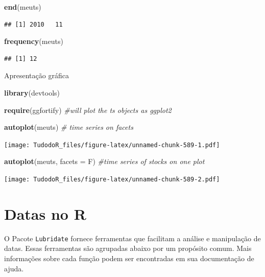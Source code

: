 \documentclass[
]{book}
\newenvironment{Shaded}{\begin{snugshade}}{\end{snugshade}}
\newcommand{\CommentTok}[1]{\textcolor[rgb]{0.56,0.35,0.01}{\textit{#1}}}
\newcommand{\DataTypeTok}[1]{\textcolor[rgb]{0.13,0.29,0.53}{#1}}
\newcommand{\KeywordTok}[1]{\textcolor[rgb]{0.13,0.29,0.53}{\textbf{#1}}}
\newcommand{\NormalTok}[1]{#1}
\begin{document}
\begin{Shaded}
\begin{Highlighting}[]
\KeywordTok{end}\NormalTok{(meuts)}
\end{Highlighting}
\end{Shaded}

\begin{verbatim}
## [1] 2010   11
\end{verbatim}

\begin{Shaded}
\begin{Highlighting}[]
\KeywordTok{frequency}\NormalTok{(meuts)}
\end{Highlighting}
\end{Shaded}

\begin{verbatim}
## [1] 12
\end{verbatim}

Apresentação gráfica

\begin{Shaded}
\begin{Highlighting}[]
\KeywordTok{library}\NormalTok{(devtools)}

\KeywordTok{require}\NormalTok{(ggfortify) }\CommentTok{#will plot the ts objects as ggplot2}

\KeywordTok{autoplot}\NormalTok{(meuts) }\CommentTok{# time series on facets}
\end{Highlighting}
\end{Shaded}

\texttt{[image: TudodoR\_files/figure-latex/unnamed-chunk-589-1.pdf]}

\begin{Shaded}
\begin{Highlighting}[]
\KeywordTok{autoplot}\NormalTok{(meuts, }\DataTypeTok{facets =}\NormalTok{ F) }\CommentTok{#time series of stocks on one plot}
\end{Highlighting}
\end{Shaded}

\texttt{[image: TudodoR\_files/figure-latex/unnamed-chunk-589-2.pdf]}

\hypertarget{datas-no-r}{%
\section{Datas no R}\label{datas-no-r}}

O Pacote \texttt{Lubridate} fornece ferramentas que facilitam a análise e manipulação de datas. Essas ferramentas são agrupadas abaixo por um propósito comum. Mais informações sobre cada função podem ser encontradas em sua documentação de ajuda.
\end{document}
